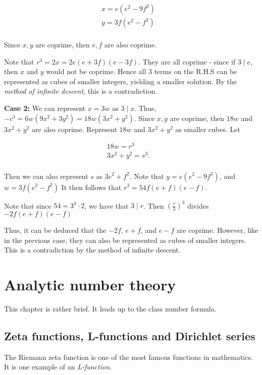 \documentclass[a4paper, 12pt,oneside,openany]{book}
\begin{document}
\begin{align*}
	x = e(e^2-9f^2) & \\
	y = 3f(e^2-f^2) & \\
\end{align*}

Since $x, y$ are coprime, then $e, f$ are also coprime.

Note that $r^3 = 2x = 2e(e+3f)(e-3f)$. They are all coprime - since if $3 \mid e$, then $x$ and $y$ would not be coprime. Hence all 3 terms on the R.H.S can be represented as cubes of smaller integers, yielding a smaller solution. By the \emph{method of infinite descent}, this is a contradiction.

\textbf{Case 2:} We can represent $x = 3w$ as $3 \mid x$. Thus, $-c^3 = 6w(9x^2+3y^2)=18w(3x^2+y^2)$. Since $x, y$ are coprime, then $18w$ and $3x^2+y^2$ are also coprime. Represent $18w$ and $3x^2+y^2$ as smaller cubes. Let

\begin{align*}
	18w = r^3 & \\
	3x^2+y^2 = s^3. & \\
\end{align*}

Then we can also represent $s$ as $3e^2+f^2$. Note that $y=e(e^2-9f^2)$, and $w = 3f(e^2-f^2)$ It then follows that $r^3 = 54f(e+f)(e-f).$ 

Note that since $54 = 3^3 \cdot 2$, we have that $3 \mid r$. Then $(\frac{r}{3})^3$ divides $-2f(e+f)(e-f)$

Thus, it can be deduced that the $-2f$, $e+f$, and $e-f$ are coprime. However, like in the previous case, they can also be represented as cubes of smaller integers. This is a contradiction by the method of infinite descent.

\chapter{Analytic number theory}
\minitoc

This chapter is rather brief. It leads up to the class number formula.

\section{Zeta functions, L-functions and Dirichlet series}

The Riemann zeta function is one of the most famous functions in mathematics. It is one example of an \emph{L-function}.
\end{document}
